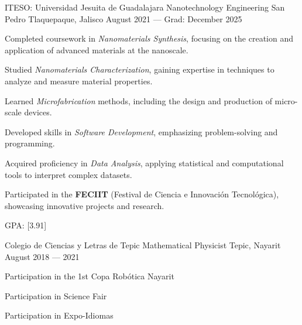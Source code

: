 \begin{cventries}
  \cventry
  {ITESO\@: Universidad Jesuita de Guadalajara}
  {Nanotechnology Engineering}
  {San Pedro Tlaquepaque, Jalisco}
  {August 2021 --- Grad: December 2025}
  {
    \begin{cvitems}
      \item {Completed coursework in \textit{Nanomaterials Synthesis}, focusing on the creation and application of advanced materials at the nanoscale.}
      \item {Studied \textit{Nanomaterials Characterization}, gaining expertise in techniques to analyze and measure material properties.}
      \item {Learned \textit{Microfabrication} methods, including the design and production of micro-scale devices.}
      \item {Developed skills in \textit{Software Development}, emphasizing problem-solving and programming.}
      \item {Acquired proficiency in \textit{Data Analysis}, applying statistical and computational tools to interpret complex datasets.}
      \item {Participated in the \textbf{FECIIT} (Festival de Ciencia e Innovación Tecnológica), showcasing innovative projects and research.}
      \item {GPA: [3.91]} %
    \end{cvitems}
  }

  \cventry
  {Colegio de Ciencias y Letras de Tepic}
  {Mathematical Physicist}
  {Tepic, Nayarit}
  {August 2018 --- 2021}
  {
    \begin{cvitems}
      \item {Participation in the 1st Copa Robótica Nayarit}
      \item {Participation in Science Fair}
      \item {Participation in Expo-Idiomas}
    \end{cvitems}
  }
\end{cventries}

\vspace{5em}
